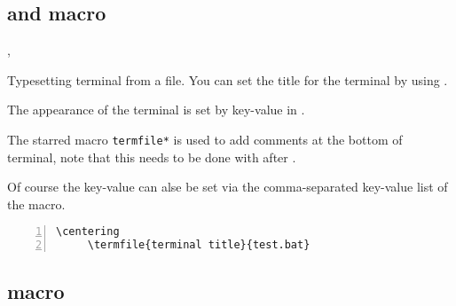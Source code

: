 \documentclass{ctxdoc}
\begin{document}
 \subsection{ and  macro}

 \begin{function}[added=2021-12-18,updated=2021-12-18]{\termfile,\termfile*}
   \begin{syntax}
         
         
   \end{syntax}

   Typesetting terminal from a file.
   You can set the title for the terminal by using .

   The appearance of the terminal is set by key-value in .

   The starred macro \texttt{termfile*} is used to add comments at the bottom of terminal,
   note that this needs to be done with  after .

   Of course the key-value  can alse be set
   via the comma-separated key-value list of the  macro.
 \end{function}

 \newpage

   \begin{Verbatim}[frame=none,numbers=left,gobble=5]
     \centering
     \termfile{terminal title}{test.bat}
   \end{Verbatim}

\begin{center}
\begin{minipage}{0.85\textwidth}
\end{minipage}
\end{center}

\subsection{ macro}
\end{document}
